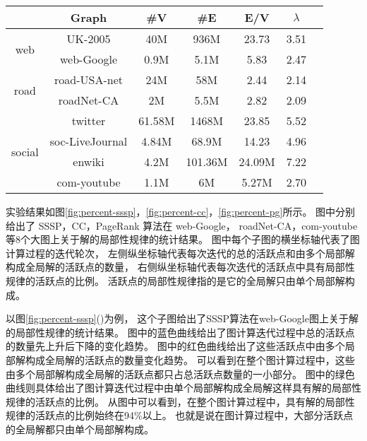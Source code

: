 \begin{table}[H]
  \centering
  \label{tab:experimental_data_set}
    \begin{tabular}{ccccccc}
     \toprule[1.5pt]
     & \textbf{Graph} & \textbf{\#V} & \textbf{\#E} & \textbf{E/V} & \textbf{$\lambda$} } \\
     \midrule[1pt]
     \multirow{2}{*}{web} & UK-2005 & 40M & 936M & 23.73 & 3.51  \\
                                         & web-Google & 0.9M & 5.1M & 5.83 & 2.47 \\
     \cmidrule(lr){1-6}
      \multirow{2}{*}{road} & road-USA-net & 24M & 58M & 2.44 & 2.14 \\
                                          & roadNet-CA & 2M & 5.5M & 2.82 & 2.09 \\
      \cmidrule(lr){1-6}
      \multirow{4}{*}{social} & twitter & 61.58M & 1468M & 23.85 & 5.52 \\
                                          & soc-LiveJournal & 4.84M & 68.9M & 14.23 & 4.96 \\
                                          & enwiki & 4.2M & 101.36M & 24.09M & 7.22 \\
                                          & com-youtube & 1.1M & 6M & 5.27M & 2.70 \\
     \bottomrule[1.5pt]
    \end{tabular}
\end{table}

实验结果如图\ref{fig:percent-sssp}，\ref{fig:percent-cc}，\ref{fig:percent-pg}所示。
图中分别给出了 SSSP，CC，PageRank 算法在 
web-Google， roadNet-CA，com-youtube
等8个大图上关于解的局部性规律的统计结果。
图中每个子图的横坐标轴代表了图计算过程的迭代轮次，
左侧纵坐标轴代表每次迭代的总的活跃点和由多个局部解构成全局解的活跃点的数量，
右侧纵坐标轴代表每次迭代的活跃点中具有局部性规律的活跃点的比例。
活跃点的局部性规律指的是它的全局解只由单个局部解构成。





以图\ref{fig:percent-sssp}()为例，
这个子图给出了SSSP算法在web-Google图上关于解的局部性规律的统计结果。
图中的蓝色曲线给出了图计算迭代过程中总的活跃点的数量先上升后下降的变化趋势。
图中的红色曲线给出了这些活跃点中由多个局部解构成全局解的活跃点的数量变化趋势。
可以看到在整个图计算过程中，这些由多个局部解构成全局解的活跃点都只占总活跃点数量的一小部分。
图中的绿色曲线则具体给出了图计算迭代过程中由单个局部解构成全局解这样具有解的局部性规律的活跃点的比例。
从图中可以看到，在整个图计算过程中，具有解的局部性规律的活跃点的比例始终在94\%以上。
也就是说在图计算过程中，大部分活跃点的全局解都只由单个局部解构成。

